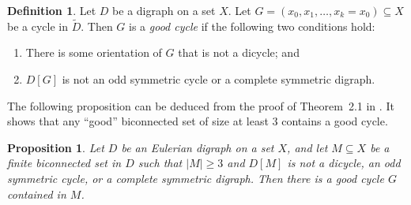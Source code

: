 \documentclass[psamsfonts]{amsart}
\newtheorem{prop}[thm]{Proposition}
\theoremstyle{definition}
\newtheorem{defn}[thm]{Definition}
\theoremstyle{remark}
\numberwithin{equation}{section}
\begin{document}
\begin{defn}
\label{def:goodcycle}
    Let $D$ be a digraph on a set $X$. Let $G = (x_0, x_1, \dots, x_k = x_0) \subseteq X$ be a cycle in $\tilde{D}$. Then $G$ is a \emph{good cycle} if the following two conditions hold:
    \begin{enumerate}
        \item There is some orientation of $G$ that is not a dicycle; and
        \item $D[G]$ is not an odd symmetric cycle or a complete symmetric digraph.
    \end{enumerate}
\end{defn}

The following proposition can be deduced from the proof of Theorem~2.1 in \cite{hm2011}. It shows that any ``good'' biconnected set of size at least $3$ contains a good cycle.

\begin{prop}
    \cite{hm2011}
    \label{prop:good cycles}
    Let $D$ be an Eulerian digraph on a set $X$, and let $M \subseteq X$ be a finite biconnected set in $D$ such that $\vert M \vert \geq 3$ and $D[M]$ is not a dicycle, an odd symmetric cycle, or a complete symmetric digraph. Then there is a good cycle $G$ contained in $M$.
\end{prop}
\end{document}
